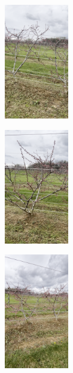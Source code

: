 \documentclass[report.tex]{subfiles}
\begin{document}
\begin{figure}[htbp]
\begin{minipage}[t]{0.32\textwidth}
            \centering
            \includegraphics[width=3cm, height=5cm]{images/amy_gardens_dataset/peach_0030.png}
            \label{fig:amygardens3}
        \end{minipage}
    \end{figure}

    \begin{figure}[htbp] \ContinuedFloat
        \centering
        \begin{minipage}[t]{0.32\textwidth}
            \centering
            \includegraphics[width=3cm, height=5cm]{images/amy_gardens_dataset/peach_0032.png}
            \label{fig:amygardens4}
        \end{minipage}%
        \hfill
        \begin{minipage}[t]{0.32\textwidth}
            \centering
            \includegraphics[width=3cm, height=5cm]{images/amy_gardens_dataset/peach_0040.png}
            \label{fig:amygardens5}

\end{minipage}
\end{figure}
\end{document}
